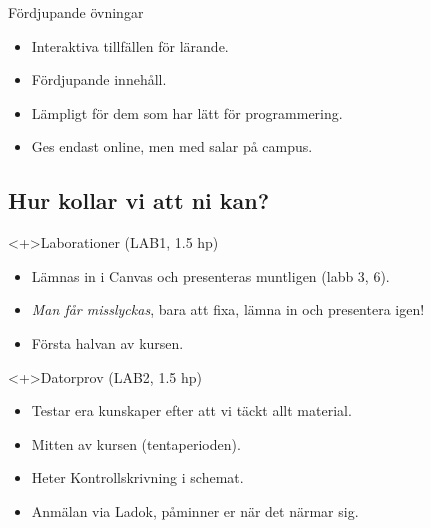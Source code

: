 \begin{frame}
  \begin{block}{Fördjupande övningar}
    \begin{itemize}
      \item Interaktiva tillfällen för lärande.
      \item Fördjupande innehåll.
      \item Lämpligt för dem som har lätt för programmering.
      \item Ges endast online, men med salar på campus.
    \end{itemize}
  \end{block}
\end{frame}


\subsection{Hur kollar vi att ni kan?}

\begin{frame}
  \begin{block}<+>{Laborationer (LAB1, 1.5 hp)}
    \begin{itemize}
      \item Lämnas in i Canvas och presenteras muntligen (labb 3, 6).
      \item \emph{Man får misslyckas}, bara att fixa, lämna in och presentera 
        igen!
      \item Första halvan av kursen.
    \end{itemize}
  \end{block}

  \begin{block}<+>{Datorprov (LAB2, 1.5 hp)}
    \begin{itemize}
      \item Testar era kunskaper efter att vi täckt allt material.
      \item Mitten av kursen (tentaperioden).
      \item Heter Kontrollskrivning i schemat.
      \item Anmälan via Ladok, påminner er när det närmar sig.
    \end{itemize}
  \end{block}
\end{frame}

